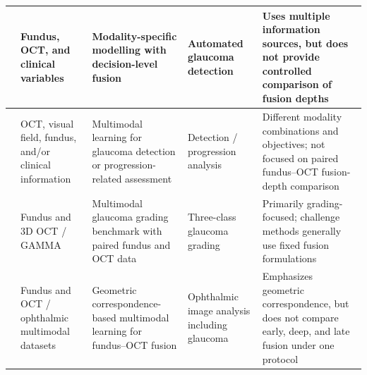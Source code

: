 \documentclass[sn-mathphys]{sn-jnl}%
\theoremstyle{thmstyleone}%
\theoremstyle{thmstyletwo}%
\theoremstyle{thmstylethree}%
\begin{document}
\begin{table}[!t]
{\begin{tabular}{|p{}|p{}|p{}|p{}|p{}|}
            \cite{mehta2021automated}                                                                   &
            Fundus, OCT, and clinical variables                                                         &
            Modality-specific modelling with decision-level fusion                                      &
            Automated glaucoma detection                                                                &
            Uses multiple information sources, but does not provide controlled comparison of fusion depths                                      \\
            \hline

            \cite{luo2023harvard,hwang2025utilization,lim2022use}                                       &
            OCT, visual field, fundus, and/or clinical information                                      &
            Multimodal learning for glaucoma detection or progression-related assessment                &
            Detection / progression analysis                                                            &
            Different modality combinations and objectives; not focused on paired fundus--OCT fusion-depth comparison                           \\
            \hline

            \cite{wu2023gamma}                                                                          &
            Fundus and 3D OCT / GAMMA                                                                   &
            Multimodal glaucoma grading benchmark with paired fundus and OCT data                       &
            Three-class glaucoma grading                                                                &
            Primarily grading-focused; challenge methods generally use fixed fusion formulations                                                \\
            \hline

            \cite{wang2024geometric}                                                                    &
            Fundus and OCT / ophthalmic multimodal datasets                                             &
            Geometric correspondence-based multimodal learning for fundus--OCT fusion                   &
            Ophthalmic image analysis including glaucoma                                                &
            Emphasizes geometric correspondence, but does not compare early, deep, and late fusion under one protocol                           \\
            \hline


\end{tabular}}
\end{table}
\end{document}
